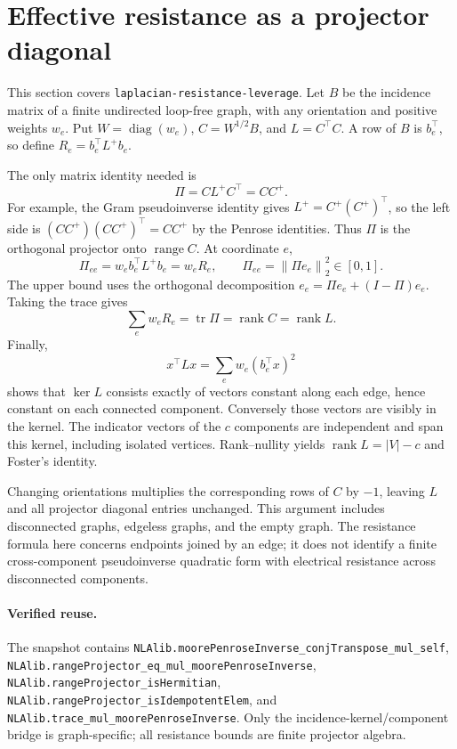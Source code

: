 \documentclass[11pt,a4paper]{article}
\newcommand{\norm}[1]{\left\lVert#1\right\rVert}
\DeclareMathOperator{\tr}{tr}
\DeclareMathOperator{\diag}{diag}
\DeclareMathOperator{\rank}{rank}
\DeclareRobustCommand{\code}[1]{{\footnotesize\urlstyle{tt}\nolinkurl{#1}}}
\begin{document}
\section{Effective resistance as a projector diagonal}
\label{sec:ns-resistance}

This section covers \code{laplacian-resistance-leverage}. Let $B$ be
the incidence matrix of a finite undirected loop-free graph, with any
orientation and positive weights $w_e$. Put
$W=\diag(w_e)$, $C=W^{1/2}B$, and $L=C^\top C$. A row of $B$ is
$b_e^\top$, so define $R_e=b_e^\top L^+b_e$.

The only matrix identity needed is
\[
 \Pi=CL^+C^\top=CC^+.
\]
For example, the Gram pseudoinverse identity gives
$L^+=C^+(C^+)^\top$, so the left side is
$(CC^+)(CC^+)^\top=CC^+$ by the Penrose identities. Thus $\Pi$ is
the orthogonal projector onto $\operatorname{range}C$. At coordinate $e$,
\[
 \Pi_{ee}=w_e b_e^\top L^+b_e=w_eR_e,
 \qquad
 \Pi_{ee}=\norm{\Pi e_e}_2^2\in[0,1].
\]
The upper bound uses the orthogonal decomposition
$e_e=\Pi e_e+(I-\Pi)e_e$. Taking the trace gives
\[
 \sum_e w_eR_e=\tr\Pi=\rank C=\rank L.
\]
Finally,
\[
 x^\top Lx=\sum_e w_e(b_e^\top x)^2
\]
shows that $\ker L$ consists exactly of vectors constant along each
edge, hence constant on each connected component. Conversely those
vectors are visibly in the kernel. The indicator vectors of the $c$
components are independent and span this kernel, including isolated
vertices. Rank--nullity yields $\rank L=|V|-c$ and Foster's identity.

Changing orientations multiplies the corresponding rows of $C$ by
$-1$, leaving $L$ and all projector diagonal entries unchanged. This
argument includes disconnected graphs, edgeless graphs, and the empty
graph. The resistance formula here concerns endpoints joined by an edge;
it does not identify a finite cross-component pseudoinverse quadratic
form with electrical resistance across disconnected components.

\paragraph{Verified reuse.}
The snapshot contains
\code{NLAlib.moorePenroseInverse_conjTranspose_mul_self},
\code{NLAlib.rangeProjector_eq_mul_moorePenroseInverse},
\code{NLAlib.rangeProjector_isHermitian},
\code{NLAlib.rangeProjector_isIdempotentElem}, and
\code{NLAlib.trace_mul_moorePenroseInverse}.
Only the incidence-kernel/component bridge is graph-specific; all
resistance bounds are finite projector algebra.
\end{document}
